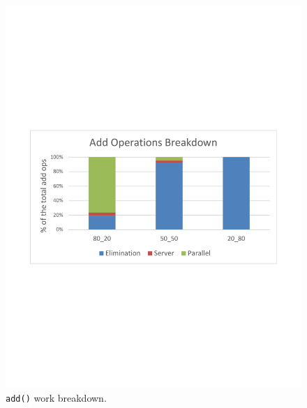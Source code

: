 \begin{figure}[htb]
\centering
\begin{minipage}[b]{.495\textwidth}
	\centering
  \includegraphics[width=\linewidth]{img/sparc-add-brk.pdf}
\caption{\texttt{add()} work breakdown.}
\label{fig:sparc_add}
\end{minipage}%
\hfill%
\begin{minipage}[b]{.495\textwidth}
	\centering

\end{minipage}
\end{figure}
